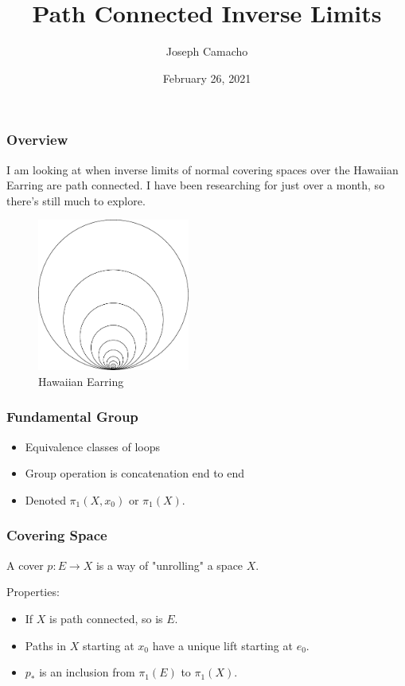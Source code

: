 \documentclass{beamer}
\title{Path Connected Inverse Limits}
\author{Joseph Camacho}
\institute{Brigham Young University}
\date{February 26, 2021}
\begin{document}
\begin{frame}
\titlepage
\end{frame}

\begin{frame}
\frametitle{Overview}
I am looking at when inverse limits of normal covering spaces over the Hawaiian Earring are path connected.  I have been researching for just over a month, so there's still much to explore.

\begin{figure}
\centering
\includegraphics[height=5cm]{images/hawaiian_earring}
\caption{Hawaiian Earring}
\end{figure}
\end{frame}

\begin{frame}
\frametitle{Fundamental Group}
\begin{itemize}
\item  Equivalence classes of loops
\item  Group operation is concatenation end to end
\item  Denoted $\pi_1(X, x_0)$ or $\pi_1(X)$.
\end{itemize}
\begin{figure}[h]
\centering{
\resizebox{!}{6cm}{\fontsize{40}{48}\selectfont {fundamental_group.pdf_tex}}
}
\end{figure}
\end{frame}

\begin{frame}[allowframebreaks]
\frametitle{Covering Space}
A cover $p : E \to X$ is a way of "unrolling" a space $X$.
\begin{figure}[h]
\centering{
\resizebox{8cm}{!}{\fontsize{40}{48}\selectfont {real_line_circle.pdf_tex}}
}
\end{figure}

\pagebreak

Properties:
\begin{itemize}
\item  If $X$ is path connected, so is $E$.
\item  Paths in $X$ starting at $x_0$ have a unique lift starting at $e_0$.
\item  $p_*$ is an inclusion from $\pi_1(E)$ to $\pi_1(X)$.
\end{itemize}
\begin{figure}[h]
\centering{
\resizebox{7cm}{!}{\fontsize{40}{48}\selectfont {covering_space.pdf_tex}}
}
\end{figure}
\end{frame}
\end{document}
